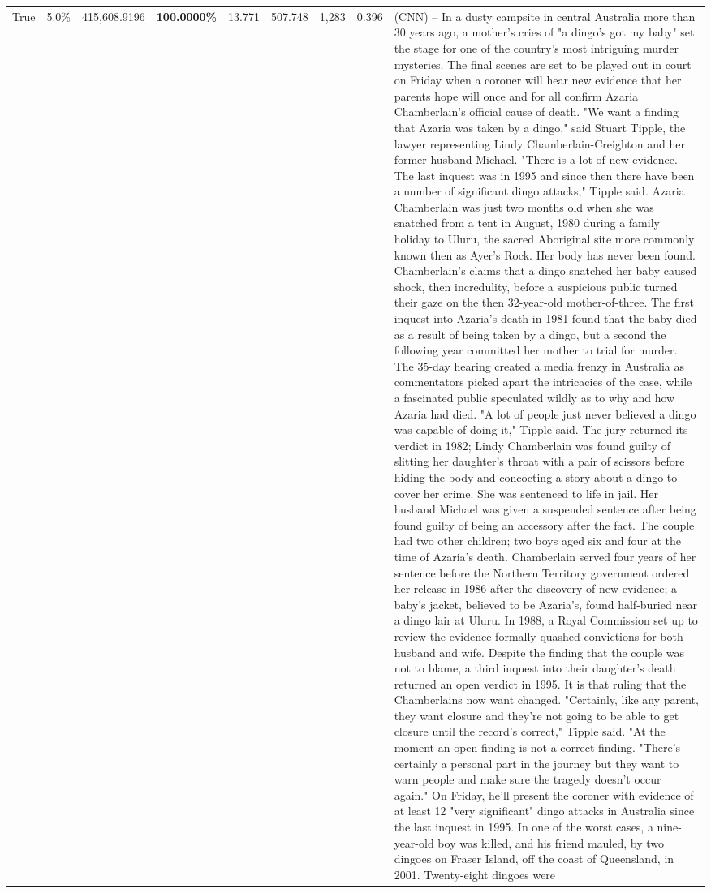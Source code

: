 \begin{table}[H]
\begin{tabular}{lllrlllll}
True & 5.0\% & 415,608.9196 & \bfseries \color{red} 100.0000\% & 13.771 & 507.748 & 1,283 & 0.396 & (CNN) -- In a dusty campsite in central Australia more than 30 years ago, a mother's cries of "a dingo's got my baby" set the stage for one of the country's most intriguing murder mysteries. The final scenes are set to be played out in court on Friday when a coroner will hear new evidence that her parents hope will once and for all confirm Azaria Chamberlain's official cause of death. "We want a finding that Azaria was taken by a dingo," said Stuart Tipple, the lawyer representing Lindy Chamberlain-Creighton and her former husband Michael. "There is a lot of new evidence. The last inquest was in 1995 and since then there have been a number of significant dingo attacks," Tipple said. Azaria Chamberlain was just two months old when she was snatched from a tent in August, 1980 during a family holiday to Uluru, the sacred Aboriginal site more commonly known then as Ayer's Rock. Her body has never been found. Chamberlain's claims that a dingo snatched her baby caused shock, then incredulity, before a suspicious public turned their gaze on the then 32-year-old mother-of-three. The first inquest into Azaria's death in 1981 found that the baby died as a result of being taken by a dingo, but a second the following year committed her mother to trial for murder. The 35-day hearing created a media frenzy in Australia as commentators picked apart the intricacies of the case, while a fascinated public speculated wildly as to why and how Azaria had died. "A lot of people just never believed a dingo was capable of doing it," Tipple said. The jury returned its verdict in 1982; Lindy Chamberlain was found guilty of slitting her daughter's throat with a pair of scissors before hiding the body and concocting a story about a dingo to cover her crime. She was sentenced to life in jail. Her husband Michael was given a suspended sentence after being found guilty of being an accessory after the fact. The couple had two other children; two boys aged six and four at the time of Azaria's death. Chamberlain served four years of her sentence before the Northern Territory government ordered her release in 1986 after the discovery of new evidence; a baby's jacket, believed to be Azaria's, found half-buried near a dingo lair at Uluru. In 1988, a Royal Commission set up to review the evidence formally quashed convictions for both husband and wife. Despite the finding that the couple was not to blame, a third inquest into their daughter's death returned an open verdict in 1995. It is that ruling that the Chamberlains now want changed. "Certainly, like any parent, they want closure and they're not going to be able to get closure until the record's correct," Tipple said. "At the moment an open finding is not a correct finding. "There's certainly a personal part in the journey but they want to warn people and make sure the tragedy doesn't occur again." On Friday, he'll present the coroner with evidence of at least 12 "very significant" dingo attacks in Australia since the last inquest in 1995. In one of the worst cases, a nine-year-old boy was killed, and his friend mauled, by two dingoes on Fraser Island, off the coast of Queensland, in 2001. Twenty-eight dingoes were 
\end{tabular}
\end{table}
